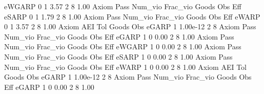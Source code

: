       eWGARP {\VBAR}    0           1        3.57           2           8        1.00  
{\smallskip}
{\smallskip}
{\smallskip}
       Axiom {\VBAR} Pass     Num_vio    Frac_vio       Goods         Obs         Eff  
       eSARP {\VBAR}    0           1        1.79           2           8        1.00  
{\smallskip}
{\smallskip}
{\smallskip}
       Axiom {\VBAR} Pass     Num_vio    Frac_vio       Goods         Obs         Eff  
       eWARP {\VBAR}    0           1        3.57           2           8        1.00  
{\smallskip}
       Axiom {\VBAR}       AEI        Tol      Goods        Obs 
       eGARP {\VBAR}         1   1.00e-12          2          8 
{\smallskip}
{\smallskip}
{\smallskip}
       Axiom {\VBAR} Pass     Num_vio    Frac_vio       Goods         Obs         Eff  
       eGARP {\VBAR}    1           0        0.00           2           8        1.00  
{\smallskip}
{\smallskip}
{\smallskip}
       Axiom {\VBAR} Pass     Num_vio    Frac_vio       Goods         Obs         Eff  
      eWGARP {\VBAR}    1           0        0.00           2           8        1.00  
{\smallskip}
{\smallskip}
{\smallskip}
       Axiom {\VBAR} Pass     Num_vio    Frac_vio       Goods         Obs         Eff  
       eSARP {\VBAR}    1           0        0.00           2           8        1.00  
{\smallskip}
{\smallskip}
{\smallskip}
       Axiom {\VBAR} Pass     Num_vio    Frac_vio       Goods         Obs         Eff  
       eWARP {\VBAR}    1           0        0.00           2           8        1.00  
{\smallskip}
       Axiom {\VBAR}       AEI        Tol      Goods        Obs 
       eGARP {\VBAR}         1   1.00e-12          2          8 
{\smallskip}
{\smallskip}
{\smallskip}
       Axiom {\VBAR} Pass     Num_vio    Frac_vio       Goods         Obs         Eff  
       eGARP {\VBAR}    1           0        0.00           2           8        1.00  
{\smallskip}
{\smallskip}
